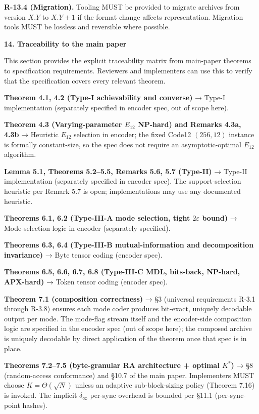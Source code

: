 \documentclass[
]{article}
\begin{document}
\textbf{R-13.4 (Migration).} Tooling MUST be provided to migrate
archives from version $X.Y$ to $X.Y+1$ if the format change affects
representation. Migration tools MUST be lossless and reversible
where possible.

\textbf{14. Traceability to the main paper}

This section provides the explicit traceability matrix from main-paper
theorems to specification requirements. Reviewers and implementers can
use this to verify that the specification covers every relevant theorem.

\textbf{Theorem 4.1, 4.2 (Type-I achievability and converse)} → Type-I
implementation (separately specified in encoder spec, out of scope
here).

\textbf{Theorem 4.3 (Varying-parameter $E_{12}$ NP-hard) and
Remarks 4.3a, 4.3b} → Heuristic $E_{12}$ selection in encoder; the
fixed Code12 $(256, 12)$ instance is formally constant-size, so the
spec does not require an asymptotic-optimal $E_{12}$ algorithm.

\textbf{Lemma 5.1, Theorems 5.2--5.5, Remarks 5.6, 5.7 (Type-II)} →
Type-II implementation (separately specified in encoder spec). The
support-selection heuristic per Remark 5.7 is open; implementations
may use any documented heuristic.

\textbf{Theorems 6.1, 6.2 (Type-III-A mode selection, tight
$2\varepsilon$ bound)} → Mode-selection logic in encoder
(separately specified).

\textbf{Theorems 6.3, 6.4 (Type-III-B mutual-information and
decomposition invariance)} → Byte tensor coding (encoder spec).

\textbf{Theorems 6.5, 6.6, 6.7, 6.8 (Type-III-C MDL, bits-back, NP-hard,
APX-hard)} → Token tensor coding (encoder spec).

\textbf{Theorem 7.1 (composition correctness)} → §3 (universal
requirements R-3.1 through R-3.8) ensures each mode coder produces
bit-exact, uniquely decodable output per mode. The mode-flag stream
itself and the encoder-side composition logic are specified in the
encoder spec (out of scope here); the composed archive is uniquely
decodable by direct application of the theorem once that spec is in
place.

\textbf{Theorems 7.2--7.5 (byte-granular RA architecture + optimal
$K^\ast$)} → §8 (random-access conformance) and §10.7 of the main
paper. Implementers MUST choose $K = \Theta(\sqrt{N})$ unless an
adaptive sub-block-sizing policy (Theorem 7.16) is invoked. The
implicit $\delta_\infty$ per-sync overhead is bounded per §11.1
(per-sync-point hashes).
\end{document}
